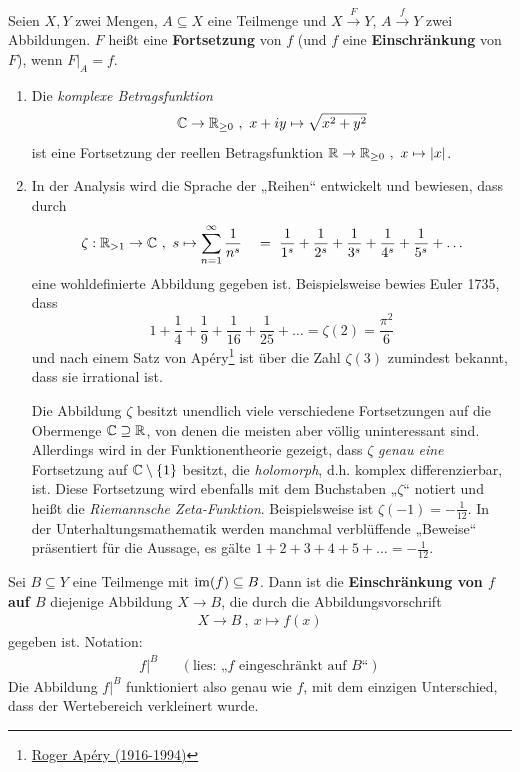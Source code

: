  
\begin{defin} \label{def:fortsetzung}  
    Seien $X,Y$ zwei Mengen, $A\subseteq X$ eine Teilmenge und $X\xrightarrow{F} Y$, $A\xrightarrow{f} Y$ zwei Abbildungen. $F$ heißt eine \textbf{Fortsetzung} von $f$ (und $f$ eine \textbf{Einschränkung} von $F$), wenn $F\vert_A=f$.
\end{defin}


\begin{bsp}[*] \quad
    \begin{enumerate}
        \item Die \emph{komplexe Betragsfunktion}
            \[ \mathbb C \to \mathbb R_{\ge 0} \ ,\ x+iy \mapsto \sqrt{x^2+y^2} \]
        ist eine Fortsetzung der reellen Betragsfunktion $\mathbb R\to \mathbb R_{\ge 0} \ ,\ x\mapsto \vert x\vert$.
        \item In der Analysis wird die Sprache der „Reihen“ entwickelt und bewiesen, dass durch
            \[ \zeta : \mathbb R_{>1} \to \mathbb C \ ,\ s \mapsto \sum_{n=1}^\infty \frac{1}{n^s} \quad =\  \frac{1}{1^s} + \frac{1}{2^s} + \frac{1}{3^s} + \frac{1}{4^s} + \frac{1}{5^s} + \ldots\]
        eine wohldefinierte Abbildung gegeben ist. Beispielsweise bewies Euler 1735, dass
            \[ 1 + \frac{1}{4} + \frac{1}{9} + \frac{1}{16} + \frac{1}{25} + \ldots = \zeta(2) = \frac{\pi^2}{6} \]
        und nach einem Satz von Apéry\footnote{\href{https://de.wikipedia.org/wiki/Roger Apery}{Roger Apéry (1916-1994)}} ist über die Zahl $\zeta(3)$ zumindest bekannt, dass sie irrational ist.

        Die Abbildung $\zeta$ besitzt unendlich viele verschiedene Fortsetzungen auf die Obermenge $\mathbb C \supseteq \mathbb R$, von denen die meisten aber völlig uninteressant sind. Allerdings wird in der Funktionentheorie gezeigt, dass $\zeta$ \emph{genau eine} Fortsetzung auf $\mathbb C\setminus \{1\}$ besitzt, die \emph{holomorph}, d.h. komplex differenzierbar, ist. Diese Fortsetzung wird ebenfalls mit dem Buchstaben „$\zeta$“ notiert und heißt die \emph{Riemannsche Zeta-Funktion}. Beispielsweise ist $\zeta(-1)=-\frac{1}{12}$. In der Unterhaltungsmathematik werden manchmal verblüffende „Beweise“ präsentiert für die Aussage, es gälte $1+2+3+4+5+\ldots = -\frac{1}{12}$.
    \end{enumerate}
\end{bsp}


\begin{defin} \label{def:zielschrank}
    Sei $B\subseteq Y$ eine Teilmenge mit $\operatorname{im}(f) \subseteq B$. Dann ist die \textbf{Einschränkung von $f$ auf $B$} diejenige Abbildung $X \to B$, die durch die Abbildungsvorschrift
    \begin{align*}
        X \to B \ ,\ x \mapsto f(x)
    \end{align*}
    gegeben ist. Notation:
    \begin{align*}
        f\vert^B && (\text{lies: „$f$ eingeschränkt auf $B$“})
    \end{align*}
    Die Abbildung $f\vert^B$ funktioniert also genau wie $f$, mit dem einzigen Unterschied, dass der Wertebereich verkleinert wurde.
\end{defin}


